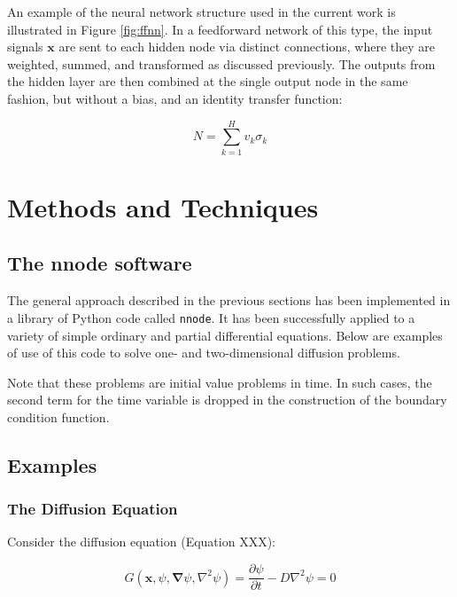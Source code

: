 \documentclass{article}
\begin{document}
An example of the neural network structure used in the current work is illustrated in Figure \ref{fig:ffnn}. In a feedforward network of this type, the input signals $\mathbf x$ are sent to each hidden node via distinct connections, where they are weighted, summed, and transformed as discussed previously. The outputs from the hidden layer are then combined at the single output node in the same fashion, but without a bias, and an identity transfer function:

\begin{equation}
  N = \sum_{k=1}^H v_k \sigma_k
\end{equation}


\newpage

\section{Methods and Techniques}

\subsection{The nnode software}

The general approach described in the previous sections has been implemented in a library of Python code called \texttt{nnode}. It has been successfully applied to a variety of simple ordinary and partial differential equations. Below are examples of use of this code to solve one- and two-dimensional diffusion problems.

Note that these problems are initial value problems in time. In such cases, the second term for the time variable is dropped in the construction of the boundary condition function.

\subsection{Examples}

\subsubsection{The Diffusion Equation}

Consider the diffusion equation (Equation XXX):

\begin{equation}
  G \left( \mathbf x, \psi, \mathbf \nabla \psi, \nabla^2 \psi \right) = \frac {\partial \psi} {\partial t} - D \nabla^2 \psi = 0
\end{equation}
\end{document}
